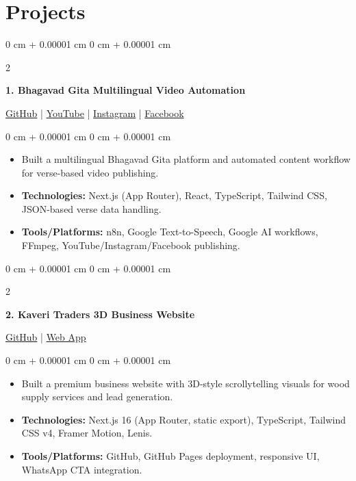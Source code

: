 \documentclass[10pt, a4paper]{article}
\newenvironment{highlights}{
    \begin{itemize}[
        topsep=0.06 cm,
        parsep=0.04 cm,
        partopsep=0pt,
        itemsep=0.02 cm,
        leftmargin=0 cm + 10pt
    ]
}{
    \end{itemize}
}
\newenvironment{onecolentry}{
    \begin{adjustwidth}{
        0 cm + 0.00001 cm
    }{
        0 cm + 0.00001 cm
    }
}{
    \end{adjustwidth}
}
\newenvironment{twocolentry}[2][4.5 cm]{
    \onecolentry
    \def\secondColumn{#2}
    \setcolumnwidth{\fill, #1}
    \begin{paracol}{2}
}{
    \switchcolumn \raggedleft \secondColumn
    \end{paracol}
    \endonecolentry
}
\begin{document}
    \section{Projects}

    \begin{twocolentry}[5.8 cm]{
        \small{\href{https://github.com/nrenx/Bhagavad-gita}{GitHub} | \href{https://www.youtube.com/@Gita_Gyanaam/playlists}{YouTube} | \href{https://www.instagram.com/gita_gyanaam/}{Instagram} | \href{https://www.facebook.com/profile.php?id=61577900636828}{Facebook}}
    }
        \textbf{1. Bhagavad Gita Multilingual Video Automation}
    \end{twocolentry}
    \begin{onecolentry}
        \begin{highlights}
            \item Built a multilingual Bhagavad Gita platform and automated content workflow for verse-based video publishing.
            \item \textbf{Technologies:} Next.js (App Router), React, TypeScript, Tailwind CSS, JSON-based verse data handling.
            \item \textbf{Tools/Platforms:} n8n, Google Text-to-Speech, Google AI workflows, FFmpeg, YouTube/Instagram/Facebook publishing.
        \end{highlights}
    \end{onecolentry}

    \vspace{0.2 cm}

    \begin{twocolentry}{
        \href{https://github.com/nrenx/kaveri_traders}{GitHub} | \href{https://nrenx.github.io/kaveri_traders/}{Web App}
    }
        \textbf{2. Kaveri Traders 3D Business Website}
    \end{twocolentry}
    \begin{onecolentry}
        \begin{highlights}
            \item Built a premium business website with 3D-style scrollytelling visuals for wood supply services and lead generation.
            \item \textbf{Technologies:} Next.js 16 (App Router, static export), TypeScript, Tailwind CSS v4, Framer Motion, Lenis.
            \item \textbf{Tools/Platforms:} GitHub, GitHub Pages deployment, responsive UI, WhatsApp CTA integration.
        \end{highlights}
    \end{onecolentry}
\end{document}
